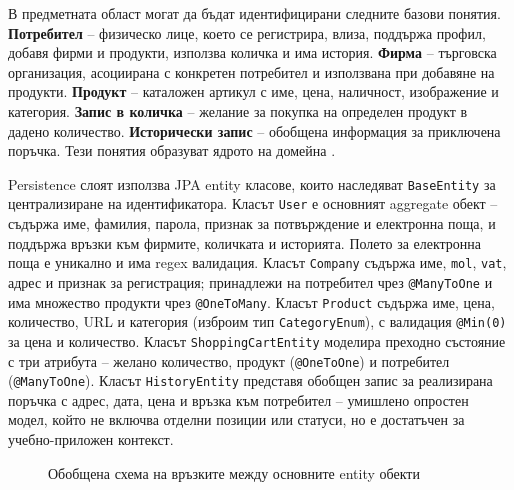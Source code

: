 В предметната област могат да бъдат идентифицирани следните базови понятия. \textbf{Потребител} -- физическо лице, което се регистрира, влиза, поддържа профил, добавя фирми и продукти, използва количка и има история. \textbf{Фирма} -- търговска организация, асоциирана с конкретен потребител и използвана при добавяне на продукти. \textbf{Продукт} -- каталожен артикул с име, цена, наличност, изображение и категория. \textbf{Запис в количка} -- желание за покупка на определен продукт в дадено количество. \textbf{Исторически запис} -- обобщена информация за приключена поръчка. Тези понятия образуват ядрото на домейна \cite{evans}.

Persistence слоят използва JPA entity класове, които наследяват \texttt{BaseEntity} за централизиране на идентификатора. Класът \texttt{User} е основният aggregate обект -- съдържа име, фамилия, парола, признак за потвърждение и електронна поща, и поддържа връзки към фирмите, количката и историята. Полето за електронна поща е уникално и има regex валидация. Класът \texttt{Company} съдържа име, \texttt{mol}, \texttt{vat}, адрес и признак за регистрация; принадлежи на потребител чрез \texttt{@ManyToOne} и има множество продукти чрез \texttt{@OneToMany}. Класът \texttt{Product} съдържа име, цена, количество, URL и категория (изброим тип \texttt{CategoryEnum}), с валидация \texttt{@Min(0)} за цена и количество. Класът \texttt{ShoppingCartEntity} моделира преходно състояние с три атрибута -- желано количество, продукт (\texttt{@OneToOne}) и потребител (\texttt{@ManyToOne}). Класът \texttt{HistoryEntity} представя обобщен запис за реализирана поръчка с адрес, дата, цена и връзка към потребител -- умишлено опростен модел, който не включва отделни позиции или статуси, но е достатъчен за учебно-приложен контекст.

\begin{figure}[H]
    \centering
    \caption{Обобщена схема на връзките между основните entity обекти}
    \label{fig:entity-relationships}
\end{figure}

